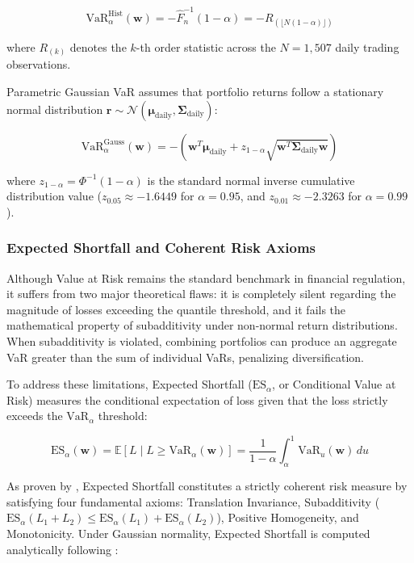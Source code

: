 \begin{equation}
  \text{VaR}_\alpha^{\text{Hist}}(\mathbf{w}) = -\widehat{F}_n^{-1}(1 - \alpha) = -R_{(\lfloor N(1-\alpha) \rfloor)}
\end{equation}

where $R_{(k)}$ denotes the $k$-th order statistic across the $N = 1,507$ daily trading observations.

Parametric Gaussian VaR assumes that portfolio returns follow a stationary normal distribution $\mathbf{r} \sim \mathcal{N}(\boldsymbol{\mu}_{\text{daily}}, \boldsymbol{\Sigma}_{\text{daily}})$:

\begin{equation}
  \text{VaR}_\alpha^{\text{Gauss}}(\mathbf{w}) = -\left( \mathbf{w}^T \boldsymbol{\mu}_{\text{daily}} + z_{1-\alpha} \sqrt{\mathbf{w}^T \boldsymbol{\Sigma}_{\text{daily}} \mathbf{w}} \right)
\end{equation}

where $z_{1-\alpha} = \Phi^{-1}(1 - \alpha)$ is the standard normal inverse cumulative distribution value ($z_{0.05} \approx -1.6449$ for $\alpha = 0.95$, and $z_{0.01} \approx -2.3263$ for $\alpha = 0.99$).

\subsubsection{Expected Shortfall and Coherent Risk Axioms}

Although Value at Risk remains the standard benchmark in financial regulation, it suffers from two major theoretical flaws: it is completely silent regarding the magnitude of losses exceeding the quantile threshold, and it fails the mathematical property of subadditivity under non-normal return distributions. When subadditivity is violated, combining portfolios can produce an aggregate VaR greater than the sum of individual VaRs, penalizing diversification.

To address these limitations, Expected Shortfall ($\text{ES}_\alpha$, or Conditional Value at Risk) measures the conditional expectation of loss given that the loss strictly exceeds the $\text{VaR}_\alpha$ threshold:

\begin{equation}
  \text{ES}_\alpha(\mathbf{w}) = \mathbb{E} \left[ L \mid L \ge \text{VaR}_\alpha(\mathbf{w}) \right] = \frac{1}{1 - \alpha} \int_{\alpha}^{1} \text{VaR}_u(\mathbf{w}) \, du
\end{equation}

As proven by \textcite{artzner1999}, Expected Shortfall constitutes a strictly coherent risk measure by satisfying four fundamental axioms: Translation Invariance, Subadditivity ($\text{ES}_\alpha(L_1 + L_2) \le \text{ES}_\alpha(L_1) + \text{ES}_\alpha(L_2)$), Positive Homogeneity, and Monotonicity. Under Gaussian normality, Expected Shortfall is computed analytically following \textcite{fabozzi2002}:

